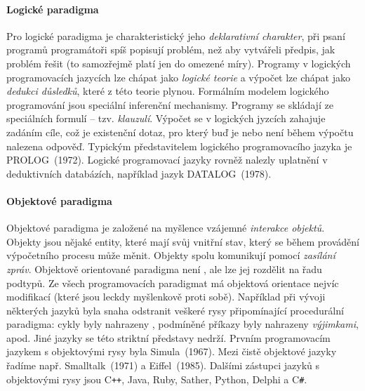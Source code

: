\documentclass[10pt,a4paper]{article}
\begin{document}
    \paragraph{Logické paradigma}
      Pro logické paradigma je charakteristický jeho \textit{deklarativní charakter}, při psaní programů programátoři spíš popisují problém, než aby vytvářeli předpis, jak problém řešit (to samozřejmě platí jen do omezené míry). Programy v logických programovacích jazycích lze chápat jako \textit{logické teorie} a výpočet lze chápat jako \textit{dedukci důsledků}, které z této teorie plynou. Formálním modelem logického programování jsou speciální inferenční mechanismy. Programy se skládají ze speciálních formulí -- tzv. \textit{klauzulí}. Výpočet se v logických jyzcích zahajuje zadáním cíle, což je existenční dotaz, pro který buď je nebo není během výpočtu nalezena odpověď. Typickým představitelem logického programovacího jazyka je PROLOG~(1972). Logické programovací jazyky rovněž nalezly uplatnění v deduktivních databázích, například jazyk DATALOG~(1978).
    \paragraph{Objektové paradigma}
      Objektové paradigma je založené na myšlence vzájemné \textit{interakce objektů}. Objekty jsou nějaké entity, které mají svůj vnitřní stav, který se během provádění výpočetního procesu může měnit. Objekty spolu komunikují pomocí \textit{zasílání zpráv}. Objektově orientované paradigma není , ale lze jej rozdělit na řadu podtypů. Ze všech programovacích paradigmat má objektová orientace nejvíc modifikací (které jsou leckdy myšlenkově proti sobě). Například při vývoji některých jazyků byla snaha odstranit veškeré rysy připomínající procedurální paradigma: cykly byly nahrazeny , podmíněné příkazy byly nahrazeny \textit{výjimkami}, apod. Jiné jazyky se této striktní představy nedrží. Prvním programovacím jazykem s objektovými rysy byla Simula~(1967). Mezi čistě objektové jazyky řadíme např. Smalltalk~(1971) a Eiffel~(1985). Dalšími zástupci jazyků s objektovými rysy jsou C\texttt{++}, Java, Ruby, Sather, Python, Delphi a C\texttt{\#}.
\end{document}
